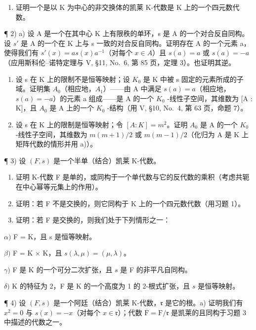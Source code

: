 \begin{enumerate}
\def\labelenumi{\alph{enumi})}
\setcounter{enumi}{1}
\tightlist
\item
  证明一个是以 K 为中心的非交换体的凯莱 K-代数是 K 上的一个四元数代数。
\end{enumerate}

¶ 2) a) 设 A 是一个在其中心 K 上有限秩的单环，s 是 A 的一个对合反自同构。设 \(s'\) 是 A 的一个在 K 上与 s 一致的对合反自同构。证明存在 A 的一个元素 a，使得我们有 \(s'(x) = as(x)a^{-1}\)（对每个 \(x \in A\)）且 \(s(a) = a\) 或 \(s(a) = -a\)（应用斯科伦--诺特定理与 V, §11, No.~6, 第 85 页，定理 3）。也证明其逆。

\begin{enumerate}
\def\labelenumi{\alph{enumi})}
\setcounter{enumi}{1}
\item
  设 s 在 K 上的限制不是恒等映射；设 \(K_{0}\) 是 K 中被 s 固定的元素所成的子域。证明集 \(A_{0}\)（相应地，\(A_{1}\)）——由 A 中满足 \(s(a) = a\)（相应地，\(s(a) = -a\)）的元素 a 组成——是 A 的一个 \(K_{0}\) -线性子空间，其维数为 {[}A : K{]}，且 \(A_{0}\) 是 A 上的一个 \(K_{0}\) -结构（用 V, §10, No.~4, 第 63 页，命题 7）。
\item
  设 s 在 K 上的限制是恒等映射；令 \([A:K]=m^{2}\)。证明 \(A_{0}\) 是 A 的一个 \(K_{0}\) -线性子空间，其维数为 \(m(m+1)/2\) 或 \(m(m-1)/2\)（化归为 A 是 K 上矩阵代数的情形并用 a)）。
\end{enumerate}

¶ 3) 设 \((F, s)\) 是一个半单（结合）凯莱 K-代数。

\begin{enumerate}
\def\labelenumi{\alph{enumi})}
\item
  证明 K-代数 F 是单的，或同构于一个单代数与它的反代数的乘积（考虑共轭在中心幂等元集上的作用）。
\item
  证明：若 F 不是交换的，则它同构于 K 上的一个四元数代数（用习题 1）。
\item
  证明：若 F 是交换的，则我们处于下列情形之一：
\end{enumerate}

\(\alpha)\) F = K，且 s 是恒等映射。

\(\beta)\) F = K × K，且 \(s(\lambda, \mu) = (\mu, \lambda)\)。

\(\gamma)\) F 是 K 的一个可分二次扩张，且 \(s\) 是 F 的非平凡自同构。

\(\delta)\) K 的特征为 2，F 是 K 的一个高度为 1 的 2-根式扩张，且 \(s\) 是恒等映射。

¶ 4) 设 \((F, s)\) 是一个阿廷（结合）凯莱 K-代数，\(\mathfrak{r}\) 是它的根。a) 证明我们有 \(x^{2} = 0\) 与 \(s(x) = -x\)（对每个 \(x \in \mathfrak{r}\)）；代数 \(\overline{\mathrm{F}} = \mathrm{F} / \mathfrak{r}\) 是凯莱的且同构于习题 3 中描述的代数之一。

